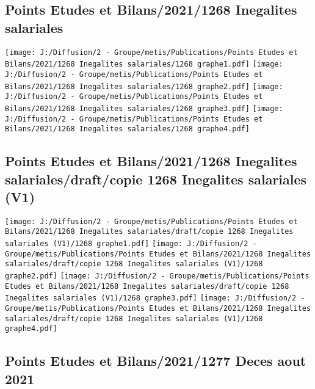 \documentclass[
]{article}
\begin{document}
\hypertarget{points-etudes-et-bilans20211268-inegalites-salariales}{%
\subsection{Points Etudes et Bilans/2021/1268 Inegalites
salariales}\label{points-etudes-et-bilans20211268-inegalites-salariales}}

\texttt{[image: J:/Diffusion/2 - Groupe/metis/Publications/Points Etudes et Bilans/2021/1268 Inegalites salariales/1268 graphe1.pdf]}
\texttt{[image: J:/Diffusion/2 - Groupe/metis/Publications/Points Etudes et Bilans/2021/1268 Inegalites salariales/1268 graphe2.pdf]}
\texttt{[image: J:/Diffusion/2 - Groupe/metis/Publications/Points Etudes et Bilans/2021/1268 Inegalites salariales/1268 graphe3.pdf]}
\texttt{[image: J:/Diffusion/2 - Groupe/metis/Publications/Points Etudes et Bilans/2021/1268 Inegalites salariales/1268 graphe4.pdf]}

\hypertarget{points-etudes-et-bilans20211268-inegalites-salarialesdraftcopie-1268-inegalites-salariales-v1}{%
\subsection{Points Etudes et Bilans/2021/1268 Inegalites
salariales/draft/copie 1268 Inegalites salariales
(V1)}\label{points-etudes-et-bilans20211268-inegalites-salarialesdraftcopie-1268-inegalites-salariales-v1}}

\texttt{[image: J:/Diffusion/2 - Groupe/metis/Publications/Points Etudes et Bilans/2021/1268 Inegalites salariales/draft/copie 1268 Inegalites salariales (V1)/1268 graphe1.pdf]}
\texttt{[image: J:/Diffusion/2 - Groupe/metis/Publications/Points Etudes et Bilans/2021/1268 Inegalites salariales/draft/copie 1268 Inegalites salariales (V1)/1268 graphe2.pdf]}
\texttt{[image: J:/Diffusion/2 - Groupe/metis/Publications/Points Etudes et Bilans/2021/1268 Inegalites salariales/draft/copie 1268 Inegalites salariales (V1)/1268 graphe3.pdf]}
\texttt{[image: J:/Diffusion/2 - Groupe/metis/Publications/Points Etudes et Bilans/2021/1268 Inegalites salariales/draft/copie 1268 Inegalites salariales (V1)/1268 graphe4.pdf]}

\hypertarget{points-etudes-et-bilans20211277-deces-aout-2021}{%
\subsection{Points Etudes et Bilans/2021/1277 Deces aout
2021}\label{points-etudes-et-bilans20211277-deces-aout-2021}}
\end{document}
